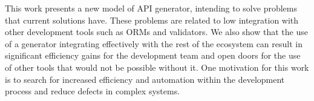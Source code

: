 This work presents a new model of API generator, intending to solve problems that
current solutions have. These problems are related to low integration with other
development tools such as ORMs and validators. We also show that the use of a
generator integrating effectively with the rest of the ecosystem can result in
significant efficiency gains for the development team and open doors for the use of
other tools that would not be possible without it. One motivation for this work
is to search for increased efficiency and automation within the development process
and reduce defects in complex systems.
